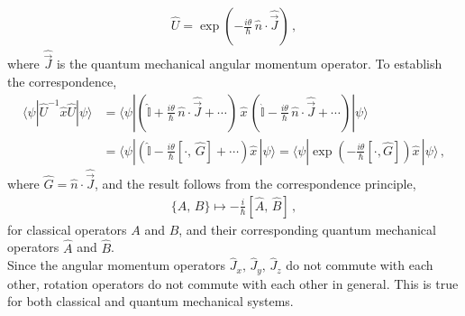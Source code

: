 \documentclass[11pt, onesided]{book}
\theoremstyle{break}
\theoremstyle{break}
\begin{document}
\begin{align*}
\hat{U} = \exp\left( - \frac{i\theta}{\hbar}\,  \hat{n}\cdot \hat{\vec{J}}\right)\,,
\end{align*}
where $\hat{\vec{J}}$ is the quantum mechanical angular momentum operator. To establish the correspondence, 
\begin{align*}
\langle \psi |\hat{U}^{-1}\hat{x}\hat{U}|\psi\rangle &=
\langle \psi | \left(
\hat{\mathbb{I}}+ \frac{i\theta}{\hbar}\,\hat{n}\cdot \hat{\vec{J}} + \cdots
\right)\, \hat{x}\,  \left(
\hat{\mathbb{I}}- \frac{i\theta}{\hbar}\,\hat{n}\cdot \hat{\vec{J}} + \cdots
\right)|\psi\rangle\\
&=\langle \psi | \left(\hat{\mathbb{I}} - \frac{i\theta}{\hbar}[\cdot,\, \hat{G}]+\cdots \right)\hat{x}\, |\psi\rangle = \langle \psi | \exp\left( -\frac{i\theta}{\hbar}[\cdot, \hat{G}]\right) \hat{x}\,|\psi\rangle\,,
\end{align*}
where $\hat{G} = \hat{n}\cdot \hat{\vec{J}}$, and the result follows from the correspondence principle, 
\begin{align*}
\{A,\, B \} \mapsto -\frac{i}{\hbar}[\hat{A},\, \hat{B}]\,,
\end{align*}
for classical operators $A$ and $B$, and their corresponding quantum mechanical operators $\hat{A}$ and $\hat{B}$.\\

Since the angular momentum operators $\hat{J}_x,\,\hat{J}_y,\,\hat{J}_z$ do not commute with each other, rotation operators do not commute with each other in general. This is true for both classical and quantum mechanical systems. \\  
\end{document}
